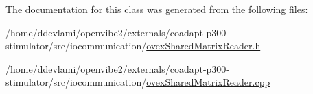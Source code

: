 The documentation for this class was generated from the following files:\begin{DoxyCompactItemize}
\item 
/home/ddevlami/openvibe2/externals/coadapt-\/p300-\/stimulator/src/iocommunication/\hyperlink{ovexSharedMatrixReader_8h}{ovexSharedMatrixReader.h}\item 
/home/ddevlami/openvibe2/externals/coadapt-\/p300-\/stimulator/src/iocommunication/\hyperlink{ovexSharedMatrixReader_8cpp}{ovexSharedMatrixReader.cpp}\end{DoxyCompactItemize}
